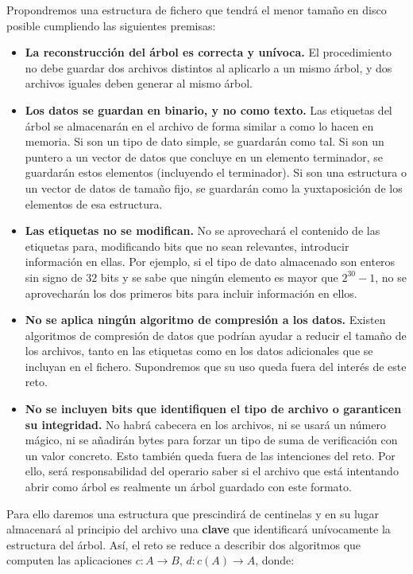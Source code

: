 \documentclass{article}
\begin{document}
Propondremos una estructura de fichero que tendrá el menor tamaño en disco
posible cumpliendo las siguientes premisas:
\begin{itemize}
	\item \textbf{La reconstrucción del árbol es correcta y unívoca.}
  El procedimiento no debe guardar dos archivos distintos al aplicarlo a un mismo
  árbol, y dos archivos iguales deben generar al mismo árbol.
	\item \textbf{Los datos se guardan en binario, y no como texto.} Las etiquetas
  del árbol se almacenarán en el archivo de forma similar a como lo hacen en
  memoria. Si son un tipo de dato simple, se guardarán como tal. Si son un puntero
  a un vector de datos que concluye en un elemento terminador, se guardarán estos
  elementos (incluyendo el terminador). Si son una estructura o un vector de datos
  de tamaño fijo, se guardarán como la yuxtaposición de los elementos de esa
  estructura.
	\item \textbf{Las etiquetas no se modifican.} No se aprovechará el contenido
  de las etiquetas para, modificando bits que no sean relevantes, introducir
  información en ellas. Por ejemplo, si el tipo de dato almacenado son enteros
  sin signo de $32$ bits y se sabe que ningún elemento es mayor que $2^{30}-1$,
  no se aprovecharán los dos primeros bits para incluir información en ellos.
	\item \textbf{No se aplica ningún algoritmo de compresión a los datos.}
  Existen algoritmos de compresión de datos que podrían ayudar a reducir el
  tamaño de los archivos, tanto en las etiquetas como en los datos adicionales
  que se incluyan en el fichero. Supondremos que su uso queda fuera del interés
  de este reto.
	\item \textbf{No se incluyen bits que identifiquen el tipo de archivo
  o garanticen su integridad.} No habrá cabecera en los archivos, ni se usará un
  número mágico, ni se añadirán bytes para forzar un tipo de suma de verificación
  con un valor concreto. Esto también queda fuera de las intenciones del reto.
  Por ello, será responsabilidad del operario saber si el archivo que está
  intentando abrir como árbol es realmente un árbol guardado con este formato. \\
\end{itemize}

Para ello daremos una estructura que prescindirá de centinelas y en su lugar
almacenará al principio del archivo una \textbf{clave} que identificará
unívocamente la estructura del árbol. Así, el reto se reduce a describir dos
algoritmos que computen las aplicaciones $c: A \to B$, $d: c(A) \to A$, donde:
\end{document}
